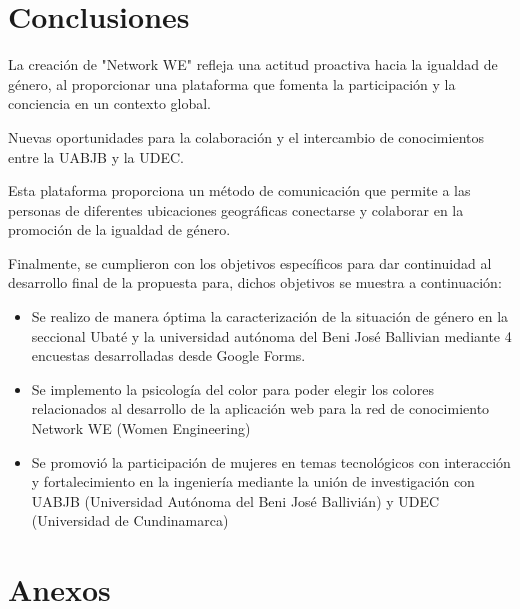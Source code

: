 \documentclass[hidelinks]{Documento}
\begin{document}
\chapter{Conclusiones}

La creación de "Network WE" refleja una actitud proactiva hacia la igualdad de género, al proporcionar una plataforma que fomenta la participación y la conciencia en un contexto global.

Nuevas oportunidades para la colaboración y el intercambio de conocimientos entre la UABJB y la UDEC.

Esta plataforma proporciona un método de comunicación que permite a las personas de diferentes ubicaciones geográficas conectarse y colaborar en la promoción de la igualdad de género. 

Finalmente, se cumplieron con los objetivos específicos para dar continuidad al desarrollo final de la propuesta para, dichos objetivos se muestra a continuación:


\begin{itemize}

\item Se realizo de manera óptima la caracterización de la situación de género en la seccional Ubaté y la universidad autónoma del Beni José Ballivian mediante 4 encuestas desarrolladas desde Google Forms.

\item Se implemento la psicología del color para poder elegir los colores relacionados al desarrollo de la aplicación web para la red de conocimiento Network WE (Women Engineering) 

\item Se promovió la participación de mujeres en temas tecnológicos con interacción y fortalecimiento en la ingeniería mediante la unión de investigación con UABJB (Universidad Autónoma del Beni José Ballivián) y UDEC (Universidad de Cundinamarca)

\end{itemize}




\backmatter
{}



\appendix
\chapter{Anexos}
\label{sec:anexos}
\end{document}

